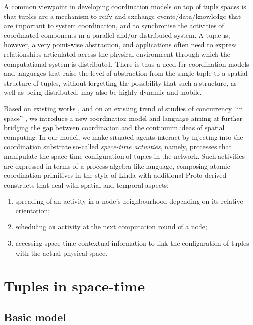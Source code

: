 \documentclass[12pt,a4paper,twoside,openright]{book}
\begin{document}
A common viewpoint in developing coordination models on top of tuple spaces is that tuples are a mechanism to reify and exchange events/data/knowledge that are important to system coordination, and to synchronise the activities of coordinated components in a parallel and/or distributed system.
%
A tuple is, however, a very point-wise abstraction, and applications often need to express relationships articulated across the physical environment through which the computational system is distributed.
%
There is thus a need for coordination models and languages that raise the level of abstraction from the single tuple to a spatial structure of tuples, without forgetting the possibility that such a structure, as well as being distributed, may also be highly dynamic and mobile.

Based on existing works \cite{VCMZ-TAAS2011,mamei2009acm,klaim,GeoLinda}, and on an existing trend of studies of concurrency ``in space'' \cite{ambients,CardelliG10,SpatialComputing,proto}, we introduce a new coordination model and language aiming at further bridging the gap between coordination and the continuum ideas of spatial computing.
%
In our model, we make situated agents interact by injecting into the coordination substrate so-called \emph{space-time activities}, namely, processes that manipulate the space-time configuration of tuples in the network.
%
Such activities are expressed in terms of a process-algebra like language, composing atomic coordination primitives in the style of Linda with additional Proto-derived constructs that deal with spatial and temporal aspects:
\begin{enumerate}
 \item spreading of an activity in a node's neighbourhood depending on its relative orientation;
 \item scheduling an activity at the next computation round of a node;
 \item accessing space-time contextual information to link the configuration of tuples with the actual physical space.
\end{enumerate}

\section{Tuples in space-time}

\subsection{Basic model}
\end{document}
